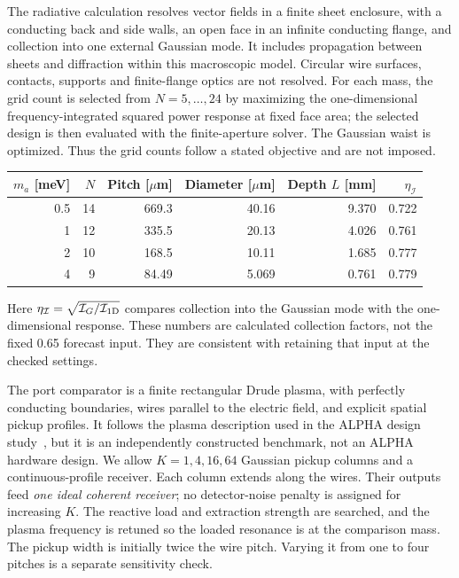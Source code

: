 \documentclass[10pt]{article}
\begin{document}
The radiative calculation resolves vector fields in a finite sheet enclosure, with a conducting back and side walls, an open face in an infinite conducting flange, and collection into one external Gaussian mode. It includes propagation between sheets and diffraction within this macroscopic model. Circular wire surfaces, contacts, supports and finite-flange optics are not resolved. For each mass, the grid count is selected from $N=5,\ldots,24$ by maximizing the one-dimensional frequency-integrated squared power response at fixed face area; the selected design is then evaluated with the finite-aperture solver. The Gaussian waist is optimized. Thus the grid counts follow a stated objective and are not imposed.

\begin{center}
\begin{tabular}{rrrrrr}
\toprule
$m_a$ [meV] & $N$ & Pitch [$\mu$m] & Diameter [$\mu$m] & Depth $L$ [mm] & $\eta_{\mathcal I}$\\
\midrule
0.5 & 14 & 669.3 & 40.16 & 9.370 & 0.722\\
1 & 12 & 335.5 & 20.13 & 4.026 & 0.761\\
2 & 10 & 168.5 & 10.11 & 1.685 & 0.777\\
4 & 9 & 84.49 & 5.069 & 0.761 & 0.779\\
\bottomrule
\end{tabular}
\end{center}
Here $\eta_{\mathcal I}=\sqrt{\mathcal I_G/\mathcal I_{\rm 1D}}$ compares collection into the Gaussian mode with the one-dimensional response. These numbers are calculated collection factors, not the fixed 0.65 forecast input. They are consistent with retaining that input at the checked settings.

The port comparator is a finite rectangular Drude plasma, with perfectly conducting boundaries, wires parallel to the electric field, and explicit spatial pickup profiles. It follows the plasma description used in the ALPHA design study~\cite{alpha}, but it is an independently constructed benchmark, not an ALPHA hardware design. We allow $K=1,4,16,64$ Gaussian pickup columns and a continuous-profile receiver. Each column extends along the wires. Their outputs feed \emph{one ideal coherent receiver}; no detector-noise penalty is assigned for increasing $K$. The reactive load and extraction strength are searched, and the plasma frequency is retuned so the loaded resonance is at the comparison mass. The pickup width is initially twice the wire pitch. Varying it from one to four pitches is a separate sensitivity check.
\end{document}

